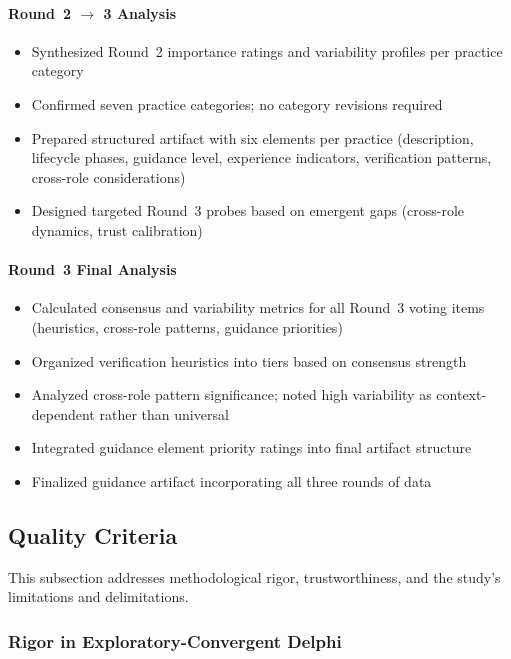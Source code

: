 \paragraph{Round~2 $\rightarrow$ 3 Analysis}
\begin{itemize}
    \item Synthesized Round~2 importance ratings and variability profiles per
          practice category
    \item Confirmed seven practice categories; no category revisions required
    \item Prepared structured artifact with six elements per practice
          (description, lifecycle phases, guidance level, experience indicators,
          verification patterns, cross-role considerations)
    \item Designed targeted Round~3 probes based on emergent gaps (cross-role
          dynamics, trust calibration)
\end{itemize}

\paragraph{Round~3 Final Analysis}
\begin{itemize}
    \item Calculated consensus and variability metrics for all Round~3 voting
          items (heuristics, cross-role patterns, guidance priorities)
    \item Organized verification heuristics into tiers based on consensus strength
    \item Analyzed cross-role pattern significance; noted high variability as
          context-dependent rather than universal
    \item Integrated guidance element priority ratings into final artifact
          structure
    \item Finalized guidance artifact incorporating all three rounds of data
\end{itemize}

\subsection{Quality Criteria}

This subsection addresses methodological rigor, trustworthiness, and the
study's limitations and delimitations.

\subsubsection{Rigor in Exploratory-Convergent Delphi}

